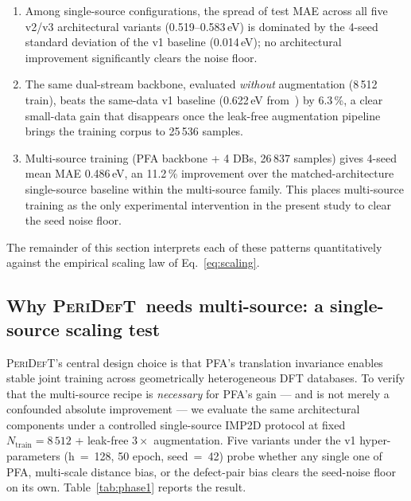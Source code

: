 \documentclass[11pt,a4paper]{article}
\newcommand{\modelname}{\textsc{PeriDefT}}
\begin{document}
\begin{enumerate}[leftmargin=20pt, itemsep=2pt]
\item Among single-source configurations, the spread of test MAE
across all five v2/v3 architectural variants
(0.519--0.583\,eV) is dominated by the 4-seed standard deviation of
the v1 baseline (0.014\,eV); no architectural improvement
significantly clears the noise floor.

\item The same dual-stream backbone, evaluated \emph{without}
augmentation (8\,512 train), beats the same-data v1 baseline
(0.622\,eV from~\cite{ourPaperV12}) by 6.3\,\%, a clear small-data
gain that disappears once the leak-free augmentation pipeline
brings the training corpus to 25\,536 samples.

\item Multi-source training (PFA backbone + 4 DBs, 26\,837 samples)
gives 4-seed mean MAE 0.486\,eV, an 11.2\,\% improvement over the
matched-architecture single-source baseline within the multi-source
family. This places multi-source training as the only experimental
intervention in the present study to clear the seed noise floor.
\end{enumerate}

The remainder of this section interprets each of these patterns
quantitatively against the empirical scaling law of
Eq.~\ref{eq:scaling}.

\subsection{Why \modelname\ needs multi-source: a single-source scaling test}\label{sec:phase1}

\modelname's central design choice is that PFA's translation
invariance enables stable joint training across geometrically
heterogeneous DFT databases. To verify that the multi-source recipe is
\emph{necessary} for PFA's gain --- and is not merely a confounded
absolute improvement --- we evaluate the same architectural components
under a controlled single-source IMP2D protocol at fixed
$N_{\mathrm{train}} = 8\,512$ + leak-free $3\times$ augmentation.
Five variants under the v1 hyper-parameters (h~=~128, 50 epoch,
seed~=~42) probe whether any single one of PFA, multi-scale distance
bias, or the defect-pair bias clears the seed-noise floor on its own.
Table~\ref{tab:phase1} reports the result.
\end{document}
